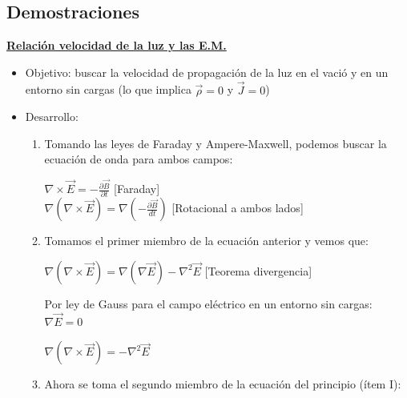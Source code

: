 \documentclass[a4paper]{article}
\begin{document}
\begin{multicols}{2}
            \subsection{Demostraciones}
                \underline{\textbf{Relación velocidad de la luz y las E.M.}}
                    \begin{itemize}
                        \item Objetivo: buscar la velocidad de propagación de la luz en el vació y en un entorno sin cargas (lo que implica $\vec{\rho} = 0$ y $\vec{J} = 0$)
                        \item Desarrollo:
                            \begin{enumerate}
                                \item Tomando las leyes de Faraday y Ampere-Maxwell, podemos buscar la ecuación de onda para ambos campos:
                                \begin{center}
                                    $\nabla \times \vec{E} = - \frac{\partial \vec{B}}{\partial t}$ \hspace{5mm} [Faraday] \\[5pt]
                                    $\nabla (\nabla \times \vec{E}) = \nabla (- \frac{\partial \vec{B}}{dt})$ \hspace{5mm} [Rotacional a ambos lados] \\[5pt]                             
                                \end{center}
                                \item Tomamos el primer miembro de la ecuación anterior y vemos que:
                                    \begin{center} $\nabla (\nabla \times \vec{E}) = \nabla (\nabla \vec{E}) - {\nabla}^2 \vec{E}$ [Teorema divergencia] \\[5pt ]\end{center}
                                    Por ley de Gauss para el campo eléctrico en un entorno sin cargas: $\nabla \vec{E} = 0$ \\[5pt]
                                    \begin{center} $\nabla (\nabla \times \vec{E}) = - {\nabla}^2 \vec{E}$ \end{center}
                                \item Ahora se toma el segundo miembro de la ecuación del principio (ítem I):
                                    \begin{center} 

\end{center}
\end{enumerate}
\end{itemize}
\end{multicols}
\end{document}
